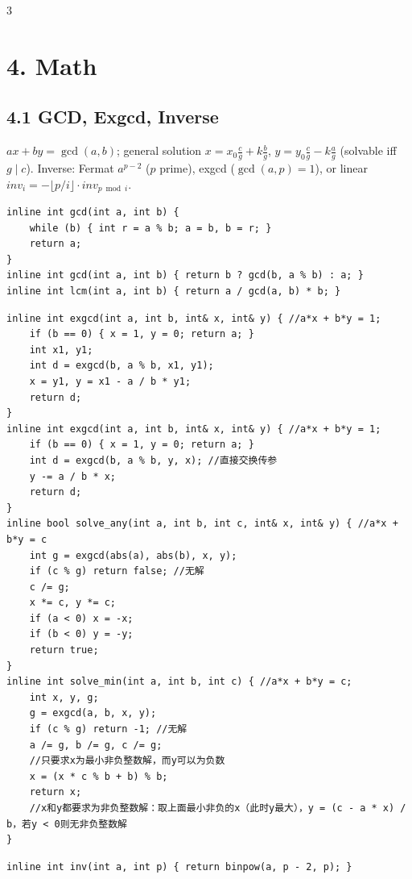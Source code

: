 \documentclass[8pt]{extarticle}
\begin{document}
\begin{multicols*}{3}
\section*{4. Math}

\subsection*{4.1 GCD, Exgcd, Inverse}

$ax + by = \gcd(a, b)$; general solution $x = x_0 \frac{c}{g} + k\frac{b}{g}$, $y = y_0 \frac{c}{g} - k \frac{a}{g}$ (solvable iff $g \mid c$). Inverse: Fermat $a^{p-2}$ ($p$ prime), exgcd ($\gcd(a, p) = 1$), or linear $inv_i = -\lfloor p/i \rfloor \cdot inv_{p \bmod i}$.


\begin{lstlisting}
inline int gcd(int a, int b) {
    while (b) { int r = a % b; a = b, b = r; }
    return a;
}
inline int gcd(int a, int b) { return b ? gcd(b, a % b) : a; }
inline int lcm(int a, int b) { return a / gcd(a, b) * b; }
\end{lstlisting}

\begin{lstlisting}
inline int exgcd(int a, int b, int& x, int& y) { //a*x + b*y = 1;
    if (b == 0) { x = 1, y = 0; return a; }
    int x1, y1;
    int d = exgcd(b, a % b, x1, y1);
    x = y1, y = x1 - a / b * y1;
    return d;
}
inline int exgcd(int a, int b, int& x, int& y) { //a*x + b*y = 1;
    if (b == 0) { x = 1, y = 0; return a; }
    int d = exgcd(b, a % b, y, x); //直接交换传参
    y -= a / b * x;
    return d;
}
inline bool solve_any(int a, int b, int c, int& x, int& y) { //a*x + b*y = c
    int g = exgcd(abs(a), abs(b), x, y);
    if (c % g) return false; //无解
    c /= g;
    x *= c, y *= c;
    if (a < 0) x = -x;
    if (b < 0) y = -y;
    return true;
}
inline int solve_min(int a, int b, int c) { //a*x + b*y = c;
    int x, y, g;
    g = exgcd(a, b, x, y);
    if (c % g) return -1; //无解
    a /= g, b /= g, c /= g;
    //只要求x为最小非负整数解，而y可以为负数
    x = (x * c % b + b) % b;
    return x;
    //x和y都要求为非负整数解：取上面最小非负的x（此时y最大），y = (c - a * x) / b，若y < 0则无非负整数解
}
\end{lstlisting}

\begin{lstlisting}
inline int inv(int a, int p) { return binpow(a, p - 2, p); }
\end{lstlisting}


\end{multicols*}
\end{document}
